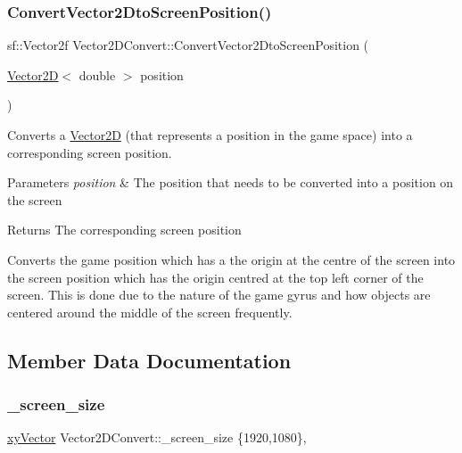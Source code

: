 \subsubsection{\texorpdfstring{Convert\+Vector2\+Dto\+Screen\+Position()}{ConvertVector2DtoScreenPosition()}}
{\footnotesize\ttfamily sf\+::\+Vector2f Vector2\+D\+Convert\+::\+Convert\+Vector2\+Dto\+Screen\+Position (\begin{DoxyParamCaption}\item[{\hyperlink{class_vector2_d}{Vector2D}$<$ double $>$}]{position }\end{DoxyParamCaption})\hspace{0.3cm}{\ttfamily [static]}}



Converts a \hyperlink{class_vector2_d}{Vector2D} (that represents a position in the game space) into a corresponding screen position. 


\begin{DoxyParams}{Parameters}
{\em position} & The position that needs to be converted into a position on the screen \\
\hline
\end{DoxyParams}
\begin{DoxyReturn}{Returns}
The corresponding screen position
\end{DoxyReturn}
Converts the game position which has a the origin at the centre of the screen into the screen position which has the origin centred at the top left corner of the screen. This is done due to the nature of the game gyrus and how objects are centered around the middle of the screen frequently. 

\subsection{Member Data Documentation}
\mbox{\label{class_vector2_d_convert_a6eef0a8081bf94301b98332ef362be2c}} 
\subsubsection{\texorpdfstring{\+\_\+screen\+\_\+size}{\_screen\_size}}
{\footnotesize\ttfamily \hyperlink{structxy_vector}{xy\+Vector} Vector2\+D\+Convert\+::\+\_\+screen\+\_\+size \{1920,1080\}\hspace{0.3cm}{\ttfamily [static]}, {\ttfamily [private]}}

